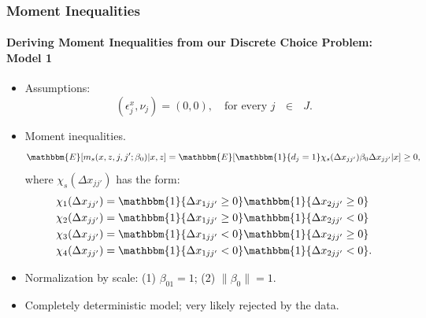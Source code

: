 \documentclass[10pt,letterpaper]{beamer}
\begin{document}
\begin{frame}
\frametitle{Moment Inequalities}
\framesubtitle{Deriving Moment Inequalities from our Discrete Choice Problem: Model 1}

\begin{itemize}
	\item Assumptions: 
	\begin{equation*}
	(\epsilon^{x}_{j}, \nu_{j}) = (0,0),\quad\text{for every $j$ $\in$ $J$.}
	\end{equation*}
	\item Moment inequalities. 
	\begin{equation*}
	\mathbbm{E}[m_{s}(x,z,j,j';\beta_{0})|x,z]=\mathbbm{E}[\mathbbm{1}\{d_{j}=1\}\chi_{s}(\Delta x_{jj'}) \beta_{0}\Delta x_{jj'}|x]\geq 0,
	\end{equation*}
	where $\chi_{s}(\Delta x_{jj'})$ has the form:
	\begin{subequations}\label{eq: inst}
	\begin{align}
	\chi_{1}(\Delta x_{jj'}) &= \mathbbm{1}\{\Delta x_{1jj'}\geq 0\}\mathbbm{1}\{\Delta x_{2jj'}\geq 0\}\\
	\chi_{2}(\Delta x_{jj'}) &= \mathbbm{1}\{\Delta x_{1jj'}\geq 0\}\mathbbm{1}\{\Delta x_{2jj'}<0\}\\
	\chi_{3}(\Delta x_{jj'}) &= \mathbbm{1}\{\Delta x_{1jj'}<0\}\mathbbm{1}\{\Delta x_{2jj'}\geq 0\}\\
	\chi_{4}(\Delta x_{jj'}) &= \mathbbm{1}\{\Delta x_{1jj'}<0\}\mathbbm{1}\{\Delta x_{2jj'}<0\}.
	\end{align}
	\end{subequations}
	\item Normalization by scale: (1) $\beta_{01}=1$; (2) $\|\beta_{0}\|=1$.
	\item Completely deterministic model; very likely rejected by the data.
\end{itemize}
\end{frame}
\end{document}
